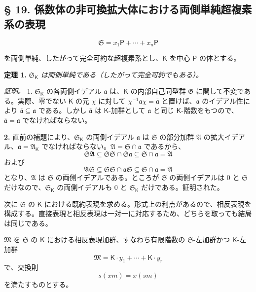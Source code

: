\subsection*{§ 19. 係数体の非可換拡大体における両側単純超複素系の表現}\label{darstellungen-zweiseitig-einfacher-hyperkomplexer-systeme-in-nichtkommutativen-erweiterungskoerpern-ihrer-koeffizientenkoerper}

\[
\mathfrak S=x_1\mathsf P+\cdots+x_n\mathsf P
\]

を両側単純、したがって完全可約な超複素系とし、$\mathsf K$ を中心 $\mathsf P$ の体とする。

\textbf{定理 1.} \emph{$\mathfrak S_{\mathsf K}$ は両側単純である（したがって完全可約でもある）。}

\emph{証明。} 1. $\mathfrak S_{\mathsf K}$ の各両側イデアル $\mathfrak a$ は、$\mathsf K$ の内部自己同型群 $\mathfrak G$ に関して不変である。実際、零でない $\mathsf K$ の元 $\chi$ に対して $\chi^{-1}\mathfrak a\chi=\bar{\mathfrak a}$ と置けば、$\mathfrak a$ のイデアル性により $\bar{\mathfrak a}\subseteq\mathfrak a$ である。しかし $\bar{\mathfrak a}$ は $\mathsf K$-加群として $\mathfrak a$ と同じ $\mathsf K$-階数をもつので、$\bar{\mathfrak a}=\mathfrak a$ でなければならない。

\textbf{2.} 直前の補題により、$\mathfrak S_{\mathsf K}$ の両側イデアル $\mathfrak a$ は $\mathfrak S$ の部分加群 $\mathfrak A$ の拡大イデアル、$\mathfrak a=\mathfrak A_{\mathsf K}$ でなければならない。$\mathfrak A=\mathfrak S\cap\mathfrak a$ であるから、
\[
\mathfrak S\mathfrak A\subseteq\mathfrak S\mathfrak S\cap\mathfrak S\mathfrak a\subseteq\mathfrak S\cap\mathfrak a=\mathfrak A
\]
および
\[
\mathfrak A\mathfrak S\subseteq\mathfrak S\mathfrak S\cap\mathfrak a\mathfrak S\subseteq\mathfrak S\cap\mathfrak a=\mathfrak A
\]
となり、$\mathfrak A$ は $\mathfrak S$ の両側イデアルである。ところが $\mathfrak S$ の両側イデアルは $0$ と $\mathfrak S$ だけなので、$\mathfrak S_{\mathsf K}$ の両側イデアルも $0$ と $\mathfrak S_{\mathsf K}$ だけである。証明された。

次に $\mathfrak S$ の $\mathsf K$ における既約表現を求める。形式上の利点があるので、相反表現を構成する。直接表現と相反表現は一対一に対応するため、どちらを取っても結局は同じである。

$\mathfrak M$ を $\mathfrak S$ の $\mathsf K$ における相反表現加群、すなわち有限階数の $\mathfrak S$-左加群かつ $\mathsf K$-左加群
\[
\mathfrak M=\mathsf K\cdot y_1+\cdots+\mathsf K\cdot y_r
\]
で、交換則
\[
s(xm)=x(sm)
\]
を満たすものとする。

